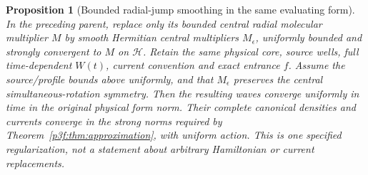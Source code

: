 \documentclass[11pt]{article}
\numberwithin{equation}{section}
\newtheorem{proposition}[theorem]{Proposition}
\theoremstyle{definition}
\theoremstyle{remark}
\begin{document}
\begin{proposition}[Bounded radial-jump smoothing in the same evaluating form]
\label{p3d:prop:smoothing}
In the preceding parent, replace only its bounded central radial
molecular multiplier $M$ by smooth Hermitian central multipliers $M_\epsilon$,
uniformly bounded and strongly convergent to $M$ on $\mathcal H$.
Retain the same physical core, source wells, full time-dependent
$W(t)$, current convention and exact entrance $f$.
Assume the source/profile bounds above uniformly, and that $M_\epsilon$
preserves the central simultaneous-rotation symmetry. Then the resulting
waves converge uniformly in time in the original physical form norm.
Their complete canonical densities and currents converge in the strong
norms required by Theorem~\ref{p3f:thm:approximation}, with uniform action.
This is one specified regularization, not a statement about arbitrary
Hamiltonian or current replacements.
\end{proposition}
\end{document}
